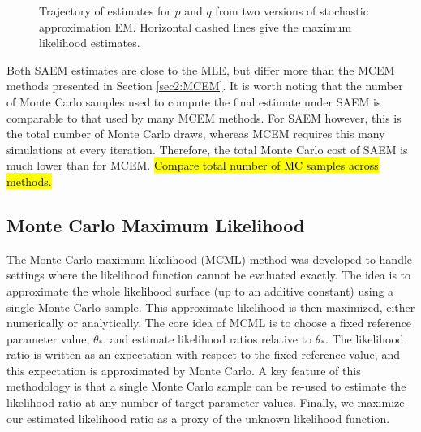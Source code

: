 \documentclass[11pt, oneside]{article}   	%
\begin{document}
\begin{figure}
    \centering
    \caption{Trajectory of estimates for $p$ and $q$ from two versions of stochastic approximation EM. Horizontal dashed lines give the maximum likelihood estimates.}

    
    \label{fig:blood_SAEM_traj}
\end{figure}


Both SAEM estimates are close to the MLE, but differ more than the MCEM methods presented in Section \ref{sec2:MCEM}. It is worth noting that the number of Monte Carlo samples used to compute the final estimate under SAEM is comparable to that used by many MCEM methods. For SAEM however, this is the total number of Monte Carlo draws, whereas MCEM requires this many simulations at every iteration. Therefore, the total Monte Carlo cost of SAEM is much lower than for MCEM. \hl{Compare total number of MC samples across methods.}




\subsection{Monte Carlo Maximum Likelihood}
\label{sec2:MCML}

The Monte Carlo maximum likelihood (MCML) method was developed to handle settings where the likelihood function cannot be evaluated exactly. The idea is to approximate the whole likelihood surface (up to an additive constant) using a single Monte Carlo sample. This approximate likelihood is then maximized, either numerically or analytically. The core idea of MCML is to choose a fixed reference parameter value, $\theta_*$, and estimate likelihood ratios relative to $\theta_*$. The likelihood ratio is written as an expectation with respect to the fixed reference value, and this expectation is approximated by Monte Carlo. A key feature of this methodology is that a single Monte Carlo sample can be re-used to estimate the likelihood ratio at any number of target parameter values. Finally, we maximize our estimated likelihood ratio as a proxy of the unknown likelihood function.
\end{document}

